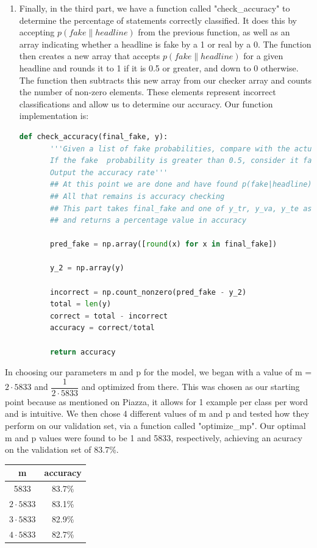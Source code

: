 \documentclass{article}
\begin{document}
\begin{enumerate}
   \item
   Finally, in the third part, we have a function called "check\_accuracy" to determine the percentage of statements correctly classified. It does this by accepting $p(fake\|headline)$ from the previous function,
   as well as an array indicating whether a headline is fake by a 1 or real by a 0. The function then creates a new array that accepts  $p(fake\|headline)$ for a given headline and rounds it to 1 if it is 0.5 or greater, and down to 0 otherwise.
   The function then subtracts this new array from our checker array and counts the number of non-zero elements. These elements represent incorrect classifications and allow us to determine our accuracy.
   Our function  implementation is:
   \begin{lstlisting}[language=Python]
   def check_accuracy(final_fake, y):
       '''Given a list of fake probabilities, compare with the actual results by rounding.
       If the fake  probability is greater than 0.5, consider it fake and if less, consider it real.
       Output the accuracy rate'''
       ## At this point we are done and have found p(fake|headline).
       ## All that remains is accuracy checking
       ## This part takes final_fake and one of y_tr, y_va, y_te as parameters
       ## and returns a percentage value in accuracy

       pred_fake = np.array([round(x) for x in final_fake])

       y_2 = np.array(y)

       incorrect = np.count_nonzero(pred_fake - y_2)
       total = len(y)
       correct = total - incorrect
       accuracy = correct/total

       return accuracy

     \end{lstlisting}





   \end{enumerate}

   In choosing our parameters m and p for the model, we began with a value of m = $2 \cdot 5833 $ and $ \dfrac {1}{2 \cdot 5833}$ and optimized from there. This was chosen as our starting point because as mentioned on Piazza, it allows for
   1 example per class per word and is intuitive. We then chose 4 different values of m and p and tested how they perform on our validation set, via a function called "optimize\_mp". Our optimal m and p values were found to be 1 and 5833, respectively, achieving an acuracy on the validation set of 83.7\%.
   \begin{center} \begin{tabular}{ c|c }
      \hline
       m & accuracy \\ [0.5ex]
      \hline \hline
       5833 & 83.7\% \\
       $2 \cdot 5833$ & 83.1\% \\
       $3 \cdot 5833$ & 82.9\%  \\
       $4 \cdot 5833$ & 82.7\%  \\
      \hline
   \end{tabular} \end{center}
\end{document}
